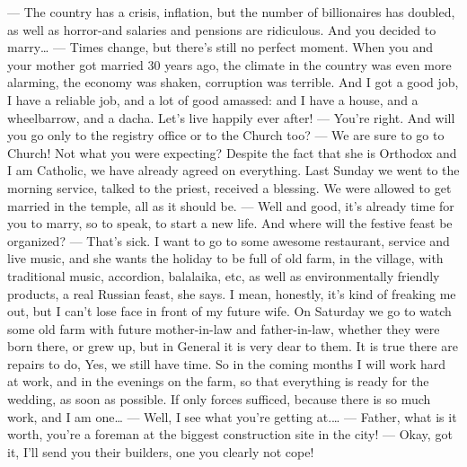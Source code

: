 — The country has a crisis, inflation, but the number of billionaires has doubled, as well as horror-and salaries and pensions are ridiculous. And you decided to marry…
— Times change, but there’s still no perfect moment. When you and your mother got married 30 years ago, the climate in the country was even more alarming, the economy was shaken, corruption was terrible. And I got a good job, I have a reliable job, and a lot of good amassed: and I have a house, and a wheelbarrow, and a dacha. Let’s live happily ever after!
— You’re right. And will you go only to the registry office or to the Church too?
— We are sure to go to Church! Not what you were expecting? Despite the fact that she is Orthodox and I am Catholic, we have already agreed on everything. 
Last Sunday we went to the morning service, talked to the priest, received a blessing. We were allowed to get married in the temple, all as it should be.
— Well and good, it’s already time for you to marry, so to speak, to start a new life. And where will the festive feast be organized?
— That’s sick. I want to go to some awesome restaurant, service and live music, and she wants the holiday to be full of old farm, in the village, with traditional music, accordion, balalaika, etc, as well as environmentally friendly products, a real Russian feast, she says. I mean, honestly, it’s kind of freaking me out, but I can’t lose face in front of my future wife. On Saturday we go to watch some old farm with future mother-in-law and father-in-law, whether they were born there, or grew up, but in General it is very dear to them. It is true there are repairs to do, Yes, we still have time. So in the coming months I will work hard at work, and in the evenings on the farm, so that everything is ready for the wedding, as soon as possible. If only forces sufficed, because there is so much work, and I am one…
— Well, I see what you’re getting at.…
— Father, what is it worth, you’re a foreman at the biggest construction site in the city!
— Okay, got it, I’ll send you their builders, one you clearly not cope!


